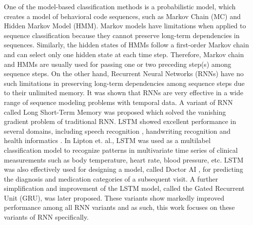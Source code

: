\documentclass{amia_summit_2018}
\begin{document}
One of the model-based classification methods is a probabilistic model, which creates a model of behavioral code sequences, such as Markov Chain (MC) and Hidden Markov Model \cite{rabiner1989tutorial} (HMM). Markov models have limitations when applied to sequence classification because they cannot preserve long-term dependencies in sequences. Similarly, the hidden states of HMMs follow a first-order Markov chain and can select only one hidden state at each time step. Therefore, Markov chain and HMMs are usually used for passing one or two preceding step(s) among sequence steps\cite{kundu1988recognition}. On the other hand, Recurrent Neural Networks (RNNs) have no such limitations in preserving long-term dependencies among sequence steps due to their unlimited memory. It was shown that RNNs are very effective in a wide range of sequence modeling problems with temporal data\cite{nion2013handwritten, lipton2015learning, choi2016doctor}. A variant of RNN called Long Short-Term Memory was proposed \cite{graves2013speech} which solved the vanishing gradient problem \cite{bengio1993problem} of traditional RNN. LSTM showed excellent performance in several domains, including speech recognition \cite{graves2013speech}, handwriting recognition \cite{nion2013handwritten} and health informatics \cite{lipton2015learning, choi2016doctor}. In Lipton et. al.\cite{lipton2015learning}, LSTM was used as a multilabel classification model to recognize patterns in multivariate time series of clinical measurements such as body temperature, heart rate, blood pressure, etc. LSTM was also effectively used for designing a model, called Doctor AI \cite{choi2016doctor}, for predicting the diagnosis and medication categories of a subsequent visit. A further simplification and improvement of the LSTM model, called the Gated Recurrent Unit\cite{chung2014empirical} (GRU), was later proposed. These variants show markedly improved performance among all RNN variants and as such, this work focuses on these variants of RNN specifically.       
\end{document}
